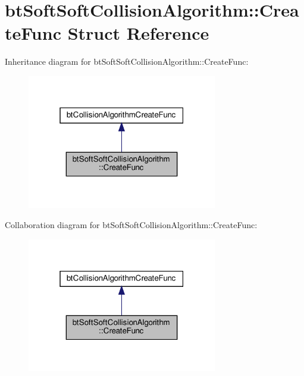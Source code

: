 \hypertarget{structbtSoftSoftCollisionAlgorithm_1_1CreateFunc}{}\section{bt\+Soft\+Soft\+Collision\+Algorithm\+:\+:Create\+Func Struct Reference}
\label{structbtSoftSoftCollisionAlgorithm_1_1CreateFunc}


Inheritance diagram for bt\+Soft\+Soft\+Collision\+Algorithm\+:\+:Create\+Func\+:
\nopagebreak
\begin{figure}[H]
\begin{center}
\leavevmode
\includegraphics[width=235pt]{structbtSoftSoftCollisionAlgorithm_1_1CreateFunc__inherit__graph}
\end{center}
\end{figure}


Collaboration diagram for bt\+Soft\+Soft\+Collision\+Algorithm\+:\+:Create\+Func\+:
\nopagebreak
\begin{figure}[H]
\begin{center}
\leavevmode
\includegraphics[width=235pt]{structbtSoftSoftCollisionAlgorithm_1_1CreateFunc__coll__graph}
\end{center}
\end{figure}
